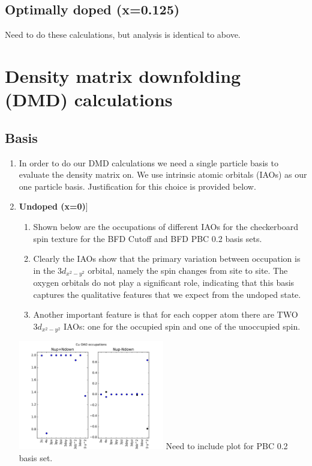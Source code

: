 \documentclass{article}
\begin{document}
\subsection{Optimally doped (x=0.125)}
\color{red} Need to do these calculations, but analysis is identical to above.

\color{black}
\section{Density matrix downfolding (DMD) calculations}
\subsection{Basis}

\begin{enumerate}
\item In order to do our DMD calculations we need a single particle basis to evaluate the density matrix on.  We use intrinsic atomic orbitals (IAOs) as our one particle basis. Justification for this choice is provided below.

\item \textbf{Undoped (x=0)}]
\begin{enumerate}
\item Shown below are the occupations of different IAOs for the checkerboard spin texture for the BFD Cutoff and BFD PBC 0.2 basis sets. 

\item Clearly the IAOs show that the primary variation between occupation is in the $3d_{x^2-y^2}$ orbital, namely the spin changes from site to site. The oxygen orbitals do not play a significant role, indicating that this basis captures the qualitative features that we expect from the undoped state.

\item Another important feature is that for each copper atom there are TWO $3d_{x^2-y^2}$ IAOs: one for the occupied spin and one of the unoccupied spin.

\end{enumerate}
\includegraphics[width=0.5\textwidth]{../undoped/PBE0_8/CHK/dens_iao2_cu.pdf}
\linebreak
\color{red} Need to include plot for PBC 0.2 basis set.


\end{enumerate}
\end{document}
